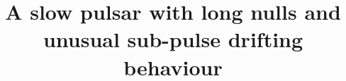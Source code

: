 \documentclass[linenumbers]{aastex631}
\begin{document}
\title{A slow pulsar with long nulls and unusual sub-pulse drifting behaviour}


\end{document}
